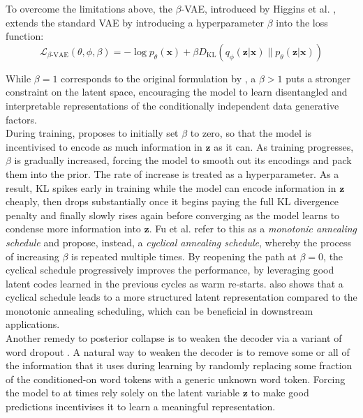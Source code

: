 \documentclass[Main.tex]{subfiles}
\begin{document}
To overcome the limitations above, the $\beta$-VAE, introduced by Higgins et al. \cite{higgins_-vae_2017}, extends the standard VAE by introducing a hyperparameter $\beta$ into the loss function:
\begin{equation}
\mathcal{L}_{\beta\text{-VAE}}(\theta, \phi, \beta) = -\log p_\theta(\mathbf{x}) + \beta D_{\text{KL}}(q_\phi(\mathbf{z}|\mathbf{x}) \| p_\theta(\mathbf{z}|\mathbf{x}))
\end{equation}

While $\beta = 1$ corresponds to the original formulation by \cite{kingma_auto-encoding_2022}, a $\beta > 1$ puts a stronger constraint on the latent space, encouraging the model to learn disentangled and interpretable representations of the conditionally independent data generative factors.\\ 

During training, \cite{bowman_generating_2016} proposes to initially set $\beta$ to zero, so that the model is incentivised to encode as much information in $\mathbf{z}$ as it can. As training progresses, $\beta$ is gradually increased, forcing the model to smooth out its encodings and pack them into the prior. The rate of increase is treated as a hyperparameter. As a result, KL spikes early in training while the model can encode information in $\mathbf{z}$ cheaply, then drops substantially once it begins paying the full KL divergence penalty and finally slowly rises again before converging as the model learns to condense more information into $\mathbf{z}$. Fu et al. \cite{fu_cyclical_2019} refer to this as a \textit{monotonic annealing schedule} and propose, instead, a \textit{cyclical annealing schedule}, whereby the process of increasing $\beta$ is repeated multiple times. By reopening the path at $\beta = 0$, the cyclical schedule progressively improves the performance, by leveraging good latent codes learned in the previous cycles as warm re-starts. \cite{fu_cyclical_2019} also shows that a cyclical schedule leads to a more structured latent representation compared to the monotonic annealing scheduling, which can be beneficial in downstream applications.\\

Another remedy to posterior collapse is to weaken the decoder via a variant of word dropout \cite{bowman_generating_2016}. A natural way to weaken the decoder is to remove some or all of the information that it uses during learning by randomly replacing some fraction of the conditioned-on word tokens with a generic unknown word token. Forcing the model to at times rely solely on the latent variable $\mathbf{z}$ to make good predictions incentivises it to learn a meaningful representation.\\
\end{document}
